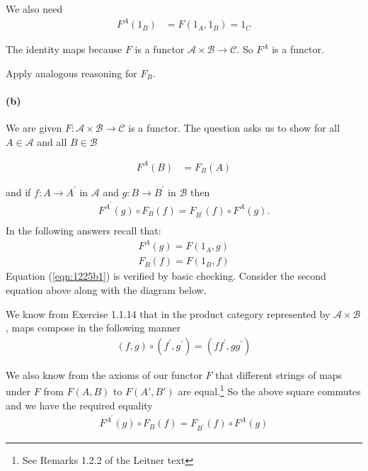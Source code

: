 \documentclass{article}
\begin{document}
We also need
\begin{align*}
F^A(1_B) &= F(1_A, 1_B) = 1_C
\end{align*}

The identity maps because $F$ is a functor $\mathcal{A} \times \mathcal{B} \rightarrow \mathcal{C}$. So $F^A$ is a functor.

Apply analogous reasoning for $F_B$.
\paragraph{(b)}

We are given $F: \mathcal{A} \times \mathcal{B} \rightarrow \mathcal{C}$ is a functor.
The question asks us to show for all $A \in \mathcal{A}$ and all $B \in \mathcal{B}$

\begin{align}
\label{eqn:1225b1}
  F^A(B) &= F_B(A)
\end{align}

and if $f: A \rightarrow A^{\prime}$ in $\mathcal{A}$ and $g: B \rightarrow B^\prime$ in
$\mathcal{B}$ then
\begin{align*}
F^{A^{\prime}}(g) \circ F_B(f) = F_{B^\prime}(f) \circ F^A(g). \\
\end{align*}
In the following answers recall that:
\begin{align*}
  F^A(g) = F(1_A, g) \\
  F_B(f) = F(1_B, f)
\end{align*}
Equation (\ref{eqn:1225b1}) is verified by basic checking. Consider the second equation above along with the diagram below.

\begin{center}
\end{center}

We know from Exercise 1.1.14 that in the product category represented by $\mathcal{A} \times \mathcal{B}$, maps compose in the following manner
\begin{align*}
  (f, g) \circ (f^{\prime},g^{\prime}) = (ff^{\prime}, gg^{\prime})
\end {align*}

We also know from the axioms of our functor $F$ that different strings of maps under $F$ from $F(A,B)$ to $F(A',B')$ are equal.\footnote{See Remarks 1.2.2 of the Leitner text} So the above square commutes and we have the required equality
\begin{align*}
  F^{A^{\prime}}(g) \circ F_B(f) = F_{B^\prime}(f) \circ F^A(g)
\end{align*}
\end{document}
